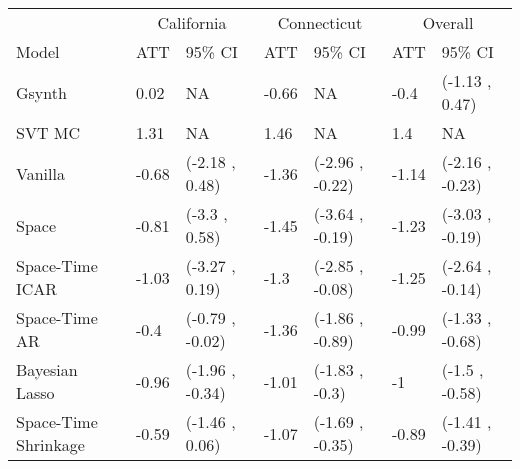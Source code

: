\begin{table}
\centering
\begin{tabular}[t]{l|l|l|l|l|l|l}
\hline
\multicolumn{1}{c|}{ } & \multicolumn{2}{c|}{California} & \multicolumn{2}{c|}{Connecticut} & \multicolumn{2}{c}{Overall} \\
\cline{2-3} \cline{4-5} \cline{6-7}
Model & ATT & 95\% CI & ATT & 95\% CI & ATT & 95\% CI\\
\hline
Gsynth & 0.02 & NA & -0.66 & NA & -0.4 & (-1.13 , 0.47)\\
\hline
SVT MC & 1.31 & NA & 1.46 & NA & 1.4 & NA\\
\hline
Vanilla & -0.68 & (-2.18 , 0.48) & -1.36 & (-2.96 , -0.22) & -1.14 & (-2.16 , -0.23)\\
\hline
Space & -0.81 & (-3.3 , 0.58) & -1.45 & (-3.64 , -0.19) & -1.23 & (-3.03 , -0.19)\\
\hline
Space-Time 
 ICAR & -1.03 & (-3.27 , 0.19) & -1.3 & (-2.85 , -0.08) & -1.25 & (-2.64 , -0.14)\\
\hline
Space-Time 
 AR & -0.4 & (-0.79 , -0.02) & -1.36 & (-1.86 , -0.89) & -0.99 & (-1.33 , -0.68)\\
\hline
Bayesian 
 Lasso & -0.96 & (-1.96 , -0.34) & -1.01 & (-1.83 , -0.3) & -1 & (-1.5 , -0.58)\\
\hline
Space-Time 
 Shrinkage & -0.59 & (-1.46 , 0.06) & -1.07 & (-1.69 , -0.35) & -0.89 & (-1.41 , -0.39)\\
\hline
\end{tabular}
\end{table}
